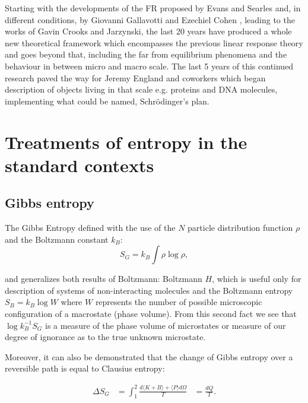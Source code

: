 \documentclass[a4paper,12pt]{article}
\begin{document}
Starting with the developments of the FR proposed by Evans and Searles\cite{Evans:2002cu} and, in different conditions, by Giovanni Gallavotti and Ezechiel Cohen \cite{Gallavotti:1995gy}, leading to the works of Gavin Crooks\cite{Crooks:2008ta} and Jarzynski\cite{Jarzynski:1997uj}, the last 20 years have produced a whole new theoretical framework which encompasses the previous linear response theory and goes beyond that, including the far from equilibrium phenomena and the behaviour in between micro and macro scale. The last 5 years of this continued research paved the way for Jeremy England and coworkers\cite{England:2015hl, England:2010fb} which began description of objects living in that scale e.g. proteins and DNA molecules, implementing what could be named, Schrödinger's plan. 

\section{Treatments of entropy in the standard contexts}

\subsection{Gibbs entropy}
\label{Gibbs entropy}
The Gibbs Entropy defined with the use of the $N$ particle distribution function $ \rho $ and the Boltzmann constant $k_B$:
\begin{equation}
  S_G = k_B \int \rho \log{\rho},
\end{equation}

and generalizes both results of Boltzmann:
Boltzmann $H$, which is useful only for description of systems of non-interacting molecules\cite{Jaynes:1965gg} and the Boltzmann entropy $S_B = k_B \log{W}$ where $W$ represents the number of possible microscopic configuration of a macrostate (phase volume). 
From this second fact we see that $\log{k_B^{-1} S_G}$ is a measure of the phase volume of microstates or measure of our degree of ignorance as to the true unknown microstate.

Moreover, it can also be demonstrated\cite{Jaynes:1965gg} that the change of Gibbs entropy over a reversible path is equal to Clausius entropy:

\begin{equation}
\begin{aligned}
  \Delta S_G &= \int_1^2 \frac{d\langle K+ B \rangle+ \langle P \rangle d\Omega}{T}
  &= \frac{dQ}{T}.
\end{aligned}
\end{equation}
\end{document}
